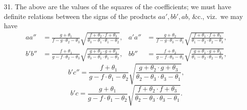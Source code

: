 \documentclass[11pt,a4paper]{article}
\begin{document}
\medskip

31. The above are the values of the squares of the coefficients; we must have definite relations between the signs of the products $aa', bb', ab$, \&c., viz.\ we may have
\begin{align*}
a a'' &= \frac{g + \theta_{1}}{f - g\cdot \theta_{2} - \theta_{3}}\sqrt{\frac{f + \theta_{2}\cdot f + \theta_{3}}{\theta_{3} - \theta_{1}\cdot \theta_{1} - \theta_{2}}}, & a' a'' &= \frac{g + \theta_{2}}{f - g\cdot \theta_{3} - \theta_{1}}\sqrt{\frac{f + \theta_{1}\cdot f + \theta_{3}}{\theta_{1} - \theta_{2}\cdot \theta_{2} - \theta_{3}}},\\
b' b'' &= \frac{f + \theta_{1}}{g - f\cdot \theta_{2} - \theta_{3}}\sqrt{\frac{g + \theta_{2}\cdot g + \theta_{3}}{\theta_{3} - \theta_{1}\cdot \theta_{1} - \theta_{2}}}, & b b'' &= \frac{f + \theta_{2}}{g - f\cdot \theta_{3} - \theta_{1}}\sqrt{\frac{g + \theta_{1}\cdot g + \theta_{3}}{\theta_{1} - \theta_{2}\cdot \theta_{2} - \theta_{3}}},
\end{align*}
\[
b' c'' = \frac{f + \theta_{1}}{g - f\cdot \theta_{1} - \theta_{2}}\sqrt{\frac{g + \theta_{2}\cdot g + \theta_{3}}{\theta_{2} - \theta_{3}\cdot \theta_{3} - \theta_{1}}},
\]
\[
b' c = \frac{g + \theta_{1}}{g - f\cdot \theta_{1} - \theta_{2}}\sqrt{\frac{f + \theta_{2}\cdot f + \theta_{3}}{\theta_{2} - \theta_{3}\cdot \theta_{3} - \theta_{1}}}.
\]

\newpage

\end{document}
